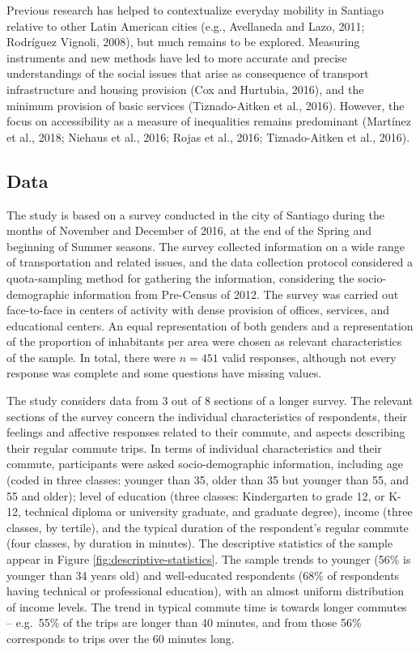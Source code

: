 \documentclass[]{elsarticle} %
\begin{document}
Previous research has helped to contextualize everyday mobility in
Santiago relative to other Latin American cities (e.g., Avellaneda and
Lazo, 2011; Rodríguez Vignoli, 2008), but much remains to be explored.
Measuring instruments and new methods have led to more accurate and
precise understandings of the social issues that arise as consequence of
transport infrastructure and housing provision (Cox and Hurtubia, 2016),
and the minimum provision of basic services (Tiznado-Aitken et al.,
2016). However, the focus on accessibility as a measure of inequalities
remains predominant (Martínez et al., 2018; Niehaus et al., 2016; Rojas
et al., 2016; Tiznado-Aitken et al., 2016).

\hypertarget{data}{%
\subsection{Data}\label{data}}

The study is based on a survey conducted in the city of Santiago during
the months of November and December of 2016, at the end of the Spring
and beginning of Summer seasons. The survey collected information on a
wide range of transportation and related issues, and the data collection
protocol considered a quota-sampling method for gathering the
information, considering the socio-demographic information from
Pre-Census of 2012. The survey was carried out face-to-face in centers
of activity with dense provision of offices, services, and educational
centers. An equal representation of both genders and a representation of
the proportion of inhabitants per area were chosen as relevant
characteristics of the sample. In total, there were \(n=451\) valid
responses, although not every response was complete and some questions
have missing values.

The study considers data from 3 out of 8 sections of a longer survey.
The relevant sections of the survey concern the individual
characteristics of respondents, their feelings and affective responses
related to their commute, and aspects describing their regular commute
trips. In terms of individual characteristics and their commute,
participants were asked socio-demographic information, including age
(coded in three classes: younger than 35, older than 35 but younger than
55, and 55 and older); level of education (three classes: Kindergarten
to grade 12, or K-12, technical diploma or university graduate, and
graduate degree), income (three classes, by tertile), and the typical
duration of the respondent's regular commute (four classes, by duration
in minutes). The descriptive statistics of the sample appear in Figure
\ref{fig:descriptive-statistics}. The sample trends to younger (56\% is
younger than 34 years old) and well-educated respondents (68\% of
respondents having technical or professional education), with an almost
uniform distribution of income levels. The trend in typical commute time
is towards longer commutes -- e.g.~55\% of the trips are longer than 40
minutes, and from those 56\% corresponds to trips over the 60 minutes
long.
\end{document}
